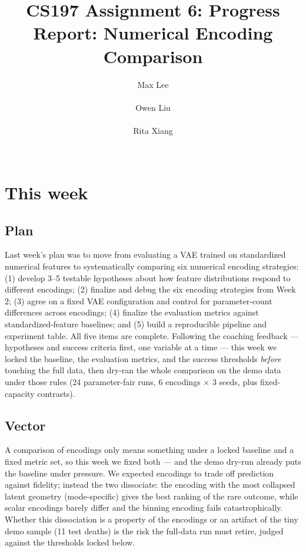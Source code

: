 \documentclass[onecolumn]{sigchi}
\def\plaintitle{CS197 Assignment 6: Progress Report: Numerical Encoding Comparison}
\begin{document}
\title{\plaintitle}
\author{%
  \alignauthor Max Lee\\
    \\
  \alignauthor Owen Liu\\
    \\
  \alignauthor Rita Xiang\\
    \\
}
\maketitle

\section{This week}
\subsection{Plan}
Last week's plan was to move from evaluating a VAE trained on standardized
numerical features to systematically comparing six numerical encoding
strategies: (1) develop 3--5 testable hypotheses about how feature
distributions respond to different encodings; (2) finalize and debug the
six encoding strategies from Week 2; (3) agree on a fixed VAE configuration
and control for parameter-count differences across encodings; (4) finalize
the evaluation metrics against standardized-feature baselines; and (5)
build a reproducible pipeline and experiment table. All five items are
complete. Following the coaching feedback --- hypotheses and success
criteria first, one variable at a time --- this week we locked the
baseline, the evaluation metrics, and the success thresholds \emph{before}
touching the full data, then dry-ran the whole comparison on the demo data
under those rules (24 parameter-fair runs, 6 encodings $\times$ 3 seeds,
plus fixed-capacity contrasts).

\subsection{Vector}
A comparison of encodings only means something under a locked baseline and
a fixed metric set, so this week we fixed both --- and the demo dry-run
already puts the baseline under pressure. We expected encodings to trade
off prediction against fidelity; instead the two dissociate: the encoding
with the most collapsed latent geometry (mode-specific) gives the best
ranking of the rare outcome, while scalar encodings barely differ and the
binning encoding fails catastrophically. Whether this dissociation is a
property of the encodings or an artifact of the tiny demo sample (11 test
deaths) is the risk the full-data run must retire, judged against the
thresholds locked below.
\end{document}
